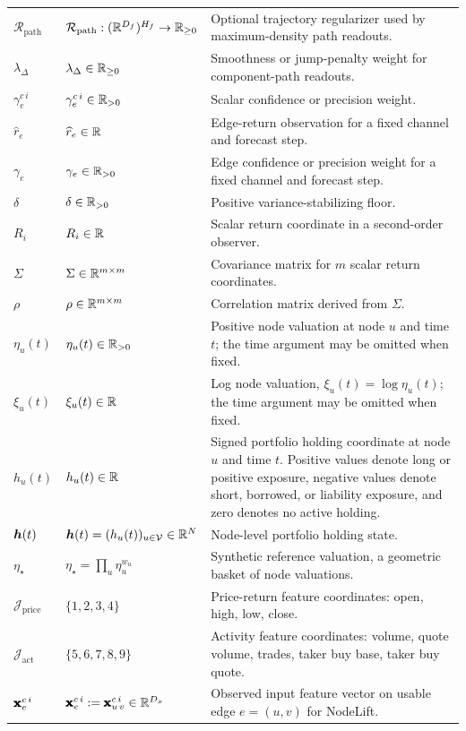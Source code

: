 \begin{center}
\begin{longtable}{>{\raggedright\arraybackslash}p{}
                  >{\raggedright\arraybackslash}p{}
                  >{\raggedright\arraybackslash}p{}}
$\mathcal{R}_{\mathrm{path}}$ & $\mathcal{R}_{\mathrm{path}}:(\mathbb{R}^{D_f})^{H_f}\rightarrow\mathbb{R}_{\ge 0}$ & Optional trajectory regularizer used by maximum-density path readouts. \\
$\lambda_{\Delta}$ & $\lambda_{\Delta}\in\mathbb{R}_{\ge 0}$ & Smoothness or jump-penalty weight for component-path readouts. \\
$\gamma_{e}^{c\,i}$ & $\gamma_{e}^{c\,i} \in \mathbb{R}_{>0}$ & Scalar confidence or precision weight. \\
$\widehat{r}_e$ & $\widehat{r}_e \in \mathbb{R}$ & Edge-return observation for a fixed channel and forecast step. \\
$\gamma_e$ & $\gamma_e \in \mathbb{R}_{>0}$ & Edge confidence or precision weight for a fixed channel and forecast step. \\
$\delta$ & $\delta \in \mathbb{R}_{>0}$ & Positive variance-stabilizing floor. \\
\midrule
$R_i$ & $R_i \in \mathbb{R}$ & Scalar return coordinate in a second-order observer. \\
$\Sigma$ & $\Sigma \in \mathbb{R}^{m \times m}$ & Covariance matrix for $m$ scalar return coordinates. \\
$\rho$ & $\rho \in \mathbb{R}^{m \times m}$ & Correlation matrix derived from $\Sigma$. \\
\midrule
$\eta_u(t)$ & $\eta_u(t) \in \mathbb{R}_{>0}$ & Positive node valuation at node $u$ and time $t$; the time argument may be omitted when fixed. \\
$\xi_u(t)$ & $\xi_u(t) \in \mathbb{R}$ & Log node valuation, $\xi_u(t)=\log \eta_u(t)$; the time argument may be omitted when fixed. \\
$h_u(t)$ & $h_u(t)\in\mathbb{R}$ & Signed portfolio holding coordinate at node $u$ and time $t$.  Positive values denote long or positive exposure, negative values denote short, borrowed, or liability exposure, and zero denotes no active holding. \\
$\bm{h}(t)$ & $\bm{h}(t)=(h_u(t))_{u\in\mathcal{V}}\in\mathbb{R}^N$ & Node-level portfolio holding state. \\
$\eta_{\star}$ & $\eta_{\star}=\prod_u\eta_u^{w_u}$ & Synthetic reference valuation, a geometric basket of node valuations. \\
$\mathcal{J}_{\mathrm{price}}$ & $\{1,2,3,4\}$ & Price-return feature coordinates: open, high, low, close. \\
$\mathcal{J}_{\mathrm{act}}$ & $\{5,6,7,8,9\}$ & Activity feature coordinates: volume, quote volume, trades, taker buy base, taker buy quote. \\
$\pmb{\mathbf{x}}_{e}^{c\,i}$ & $\pmb{\mathbf{x}}_{e}^{c\,i}:=\pmb{\mathbf{x}}_{u\,v}^{c\,i}\in\mathbb{R}^{D_x}$ & Observed input feature vector on usable edge $e=(u,v)$ for NodeLift. \\

\end{longtable}
\end{center}
